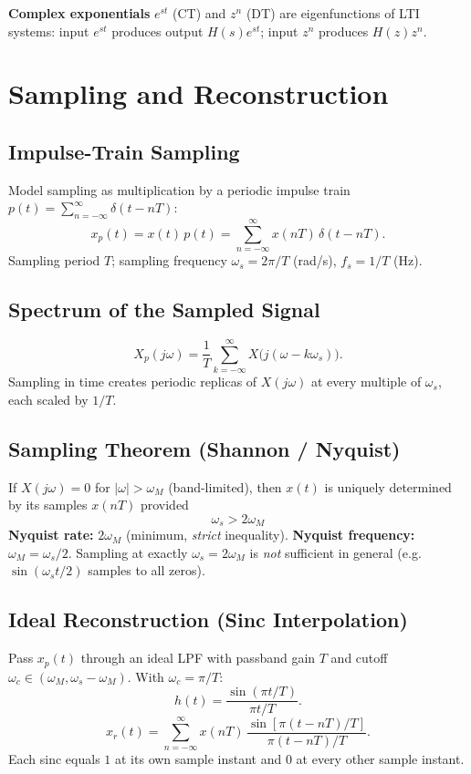 \documentclass[10pt]{article}
\begin{document}
\textbf{Complex exponentials} $e^{st}$ (CT) and $z^n$ (DT) are eigenfunctions of LTI systems: input $e^{st}$ produces output $H(s)e^{st}$; input $z^n$ produces $H(z)z^n$.

\section{Sampling and Reconstruction}

\subsection{Impulse-Train Sampling}
Model sampling as multiplication by a periodic impulse train
$p(t) = \sum_{n=-\infty}^{\infty}\delta(t - nT)$:
\[
x_p(t) = x(t)\,p(t) = \sum_{n=-\infty}^{\infty} x(nT)\,\delta(t - nT).
\]
Sampling period $T$; sampling frequency $\omega_s = 2\pi/T$ (rad/s),
$f_s = 1/T$ (Hz).

\subsection{Spectrum of the Sampled Signal}
\[
\boxed{\,X_p(j\omega) = \frac{1}{T}\sum_{k=-\infty}^{\infty}
X\!\bigl(j(\omega - k\omega_s)\bigr).\,}
\]
Sampling in time creates periodic replicas of $X(j\omega)$ at every multiple
of $\omega_s$, each scaled by $1/T$.

\subsection{Sampling Theorem (Shannon / Nyquist)}
If $X(j\omega) = 0$ for $|\omega|>\omega_M$ (band-limited), then $x(t)$ is
uniquely determined by its samples $x(nT)$ provided
\[
\boxed{\,\omega_s > 2\omega_M\,}
\]
\textbf{Nyquist rate:} $2\omega_M$ (minimum, \emph{strict} inequality).
\textbf{Nyquist frequency:} $\omega_M = \omega_s/2$.
Sampling at exactly $\omega_s = 2\omega_M$ is \emph{not} sufficient in general
(e.g.\ $\sin(\omega_s t/2)$ samples to all zeros).

\subsection{Ideal Reconstruction (Sinc Interpolation)}
Pass $x_p(t)$ through an ideal LPF with passband gain $T$ and cutoff
$\omega_c\in(\omega_M,\omega_s-\omega_M)$. With $\omega_c = \pi/T$:
\[
h(t) = \frac{\sin(\pi t/T)}{\pi t/T}.
\]
\[
\boxed{\,x_r(t) = \sum_{n=-\infty}^{\infty} x(nT)\,
\frac{\sin[\pi(t - nT)/T]}{\pi(t - nT)/T}.\,}
\]
Each sinc equals $1$ at its own sample instant and $0$ at every other sample instant.
\end{document}
